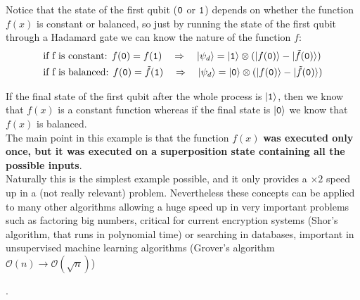 Notice that the state of the first qubit ($\texttt{0}$ or $\texttt{1}$) depends on whether the function $f(x)$ is constant or balanced, so just by running the state of the first qubit through a Hadamard gate we can know the nature of the function $f$:
\begin{equation}
  \begin{split}
    &\text{if f is constant:   }f(\texttt{0})=f(\texttt{1})\quad\Rightarrow\quad
    |\psi_d\rangle= |\texttt{1}\rangle\otimes(|f(\texttt{0})\rangle-|\tilde{f}(\texttt{0})\rangle)\\
    &\text{if f is balanced:   } f(\texttt{0})=\tilde{f}(\texttt{1})\quad\Rightarrow\quad
    |\psi_d\rangle= |\texttt{0}\rangle\otimes(|f(\texttt{0})\rangle-|\tilde{f}(\texttt{0})\rangle)
  \end{split}
\end{equation}

If the final state of the first qubit after the whole process is $|\texttt{1}\rangle$, then we know that $f(x)$ is a constant function whereas if the final state is $|\texttt{0}\rangle$ we know that $f(x)$ is balanced.\\

The main point in this example is that the function $f(x)$ \textbf{was executed only once, but it was executed on a superposition state containing all the possible inputs}.\\

Naturally this is the simplest example possible, and it only provides a $\times2$ speed up in a (not really relevant) problem. Nevertheless these concepts can be applied to many other algorithms allowing a huge speed up in very important problems such as factoring big numbers, critical for current encryption systems (Shor's algorithm, that runs in polynomial time) or searching in databases, important in unsupervised machine learning algorithms (Grover's algorithm $\mathcal{O}(n)\rightarrow\mathcal{O}(\sqrt{n})$)

.

